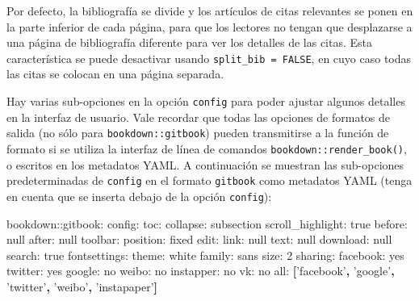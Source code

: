 \documentclass[12pt,]{krantz}
\makeatletter
\newenvironment{Shaded}{\begin{snugshade}}{\end{snugshade}}
\newcommand{\KeywordTok}[1]{\textcolor[rgb]{0.13,0.29,0.53}{\textbf{{#1}}}}
\newcommand{\DataTypeTok}[1]{\textcolor[rgb]{0.13,0.29,0.53}{{#1}}}
\newcommand{\StringTok}[1]{\textcolor[rgb]{0.31,0.60,0.02}{{#1}}}
\newcommand{\FunctionTok}[1]{\textcolor[rgb]{0.00,0.00,0.00}{{#1}}}
\newcommand{\NormalTok}[1]{{#1}}
\newenvironment{kframe}{%
\medskip{}
\setlength{\fboxsep}{.8em}
 \def\at@end@of@kframe{}%
 \ifinner\ifhmode%
  \def\at@end@of@kframe{\end{minipage}}%
  \begin{minipage}{\columnwidth}%
 \fi\fi%
 \def\FrameCommand##1{\hskip\@totalleftmargin \hskip-\fboxsep
 \colorbox{shadecolor}{##1}\hskip-\fboxsep
     \hskip-\linewidth \hskip-\@totalleftmargin \hskip\columnwidth}%
 \MakeFramed {\advance\hsize-\width
   \@totalleftmargin\z@ \linewidth\hsize
   \@setminipage}}%
 {\par\unskip\endMakeFramed%
 \at@end@of@kframe}
\renewenvironment{Shaded}{\begin{kframe}}{\end{kframe}}
\theoremstyle{definition}
\theoremstyle{definition}
\theoremstyle{remark}
\makeatother
\begin{document}
Por defecto, la bibliografía se divide y los artículos de citas
relevantes se ponen en la parte inferior de cada página, para que los
lectores no tengan que desplazarse a una página de bibliografía
diferente para ver los detalles de las citas. Esta característica se
puede desactivar usando \texttt{split\_bib\ =\ FALSE}, en cuyo caso
todas las citas se colocan en una página separada.

Hay varias sub-opciones en la opción \texttt{config} para poder ajustar
algunos detalles en la interfaz de usuario. Vale recordar que todas las
opciones de formatos de salida (no sólo para \texttt{bookdown::gitbook})
pueden transmitirse a la función de formato si se utiliza la interfaz de
línea de comandos \texttt{bookdown::render\_book()}, o escritos en los
metadatos YAML. A continuación se muestran las sub-opciones
predeterminadas de \texttt{config} en el formato \texttt{gitbook} como
metadatos YAML (tenga en cuenta que se inserta debajo de la opción
\texttt{config}):

\begin{Shaded}
\begin{Highlighting}[]
\FunctionTok{bookdown:}\NormalTok{:gitbook:}
  \FunctionTok{config:}
    \FunctionTok{toc:}
      \FunctionTok{collapse:} \NormalTok{subsection}
      \FunctionTok{scroll_highlight:} \NormalTok{true}
      \FunctionTok{before:} \DataTypeTok{null}
      \FunctionTok{after:} \DataTypeTok{null}
    \FunctionTok{toolbar:}
      \FunctionTok{position:} \NormalTok{fixed}
    \FunctionTok{edit:}
      \FunctionTok{link:} \DataTypeTok{null}
      \FunctionTok{text:} \DataTypeTok{null}
    \FunctionTok{download:} \DataTypeTok{null}
    \FunctionTok{search:} \NormalTok{true}
    \FunctionTok{fontsettings:}
      \FunctionTok{theme:} \NormalTok{white}
      \FunctionTok{family:} \NormalTok{sans}
      \FunctionTok{size:} \NormalTok{2}
    \FunctionTok{sharing:}
      \FunctionTok{facebook:} \NormalTok{yes}
      \FunctionTok{twitter:} \NormalTok{yes}
      \FunctionTok{google:} \NormalTok{no}
      \FunctionTok{weibo:} \NormalTok{no}
      \FunctionTok{instapper:} \NormalTok{no}
      \FunctionTok{vk:} \NormalTok{no}
      \FunctionTok{all:} \KeywordTok{[}\StringTok{'facebook'}\KeywordTok{,} \StringTok{'google'}\KeywordTok{,} \StringTok{'twitter'}\KeywordTok{,} \StringTok{'weibo'}\KeywordTok{,} \StringTok{'instapaper'}\KeywordTok{]}
\end{Highlighting}
\end{Shaded}
\end{document}
